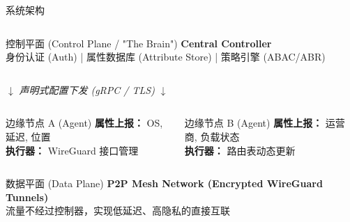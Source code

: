 \documentclass[aspectratio=169, 10pt]{beamer}
\begin{document}
\begin{frame}{系统架构}
    \centering

    \begin{columns}[t]
        \begin{block}{控制平面 (Control Plane / "The Brain")}
            \centering
            \textbf{Central Controller} \\
            \vspace{0.2em}
            \footnotesize 身份认证 (Auth) \quad | \quad 属性数据库 (Attribute Store) \quad | \quad 策略引擎 (ABAC/ABR)
        \end{block}
    \end{columns}

    \vspace{0.5em}
    $\downarrow$ \textit{\scriptsize 声明式配置下发 (gRPC / TLS)} $\downarrow$

    \begin{columns}[t]
        \begin{exampleblock}{边缘节点 A (Agent)}
            \footnotesize
            \textbf{属性上报：} OS, 延迟, 位置 \\
            \textbf{执行器：} WireGuard 接口管理
        \end{exampleblock}

        \begin{exampleblock}{边缘节点 B (Agent)}
            \footnotesize
            \textbf{属性上报：} 运营商, 负载状态 \\
            \textbf{执行器：} 路由表动态更新
        \end{exampleblock}
    \end{columns}

    \vspace{1em}

    \begin{alertblock}{数据平面 (Data Plane)}
        \centering
        \textbf{P2P Mesh Network (Encrypted WireGuard Tunnels)} \\
        \footnotesize 流量不经过控制器，实现低延迟、高隐私的直接互联
    \end{alertblock}

\end{frame}
\end{document}
